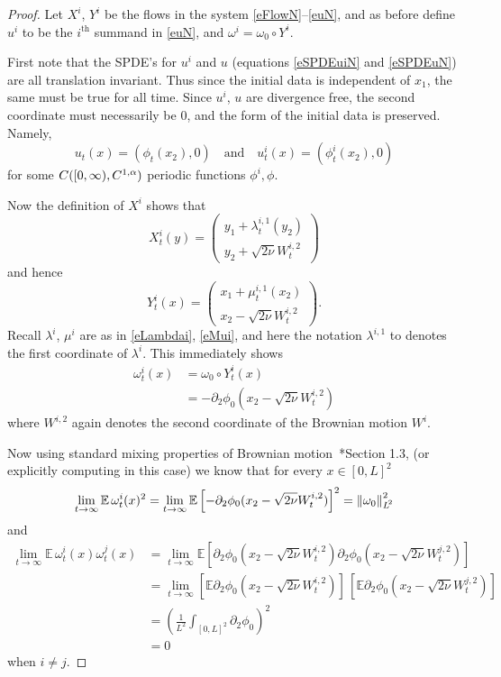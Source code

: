 \documentclass[final]{amsart}%
\newcommand{\mceuler}{\eqref{eFlowN}--\eqref{euN}\xspace}
\newcommand{\del}{\partial}
\newcommand{\E}{\mathbb{E}}
\newcommand{\holderspace}[2]{\ensuremath{C^{\ifx0#1{#2}\else{#1,#2}\fi}}}
\newif\iftextstyle
\newcommand{\norm}[1]{\iftextstyle\lVert#1\rVert\else\left\lVert#1\right\rVert\fi}
\newcommand{\lpnorm}[2]{\norm{#1}_{\smash{L^{\!#2}_{\vphantom{h}}}\vphantom{L^{\!#2}}}}
\numberwithin{equation}{section}
\theoremstyle{definition}
\theoremstyle{remark}
\begin{document}
\begin{proof}%
Let $X^i$, $Y^i$ be the flows in the system \mceuler, and as before define $u^i$ to be the $i^\text{th}$ summand in \eqref{euN}, and $\omega^i = \omega_0 \circ Y^i$.

First note that the SPDE's for $u^i$ and $u$ (equations \eqref{eSPDEuiN} and \eqref{eSPDEuN}) are all translation invariant. Thus since the initial data is independent of $x_1$, the same must be true for all time. Since $u^i$, $u$ are divergence free, the second coordinate must necessarily be $0$, and the form of the initial data is preserved. Namely,
$$
u_t(x) = (\phi_t(x_2), 0) \quad\text{and}\quad u^i_t(x) = (\phi^i_t(x_2), 0) 
$$
for some $C([0,\infty), \holderspace{1}{\alpha})$ periodic functions $\phi^i, \phi$.

Now the definition of $X^i$ shows that
$$
X^i_t(y) =
\begin{pmatrix}
  y_1 + \lambda^{i,1}_t(y_2)\\
  y_2 + \sqrt{2\nu} W^{i,2}_t
\end{pmatrix}
$$
and hence
$$
Y^i_t(x) =
\begin{pmatrix}
  x_1 + \mu^{i,1}_t(x_2)\\
  x_2 - \sqrt{2\nu} W^{i,2}_t
\end{pmatrix}.
$$
Recall $\lambda^i$, $\mu^i$ are as in \eqref{eLambdai}, \eqref{eMui}, and here the notation $\lambda^{i,1}$ to denotes the first coordinate of $\lambda^i$. This immediately shows
\begin{align*}
\omega^i_t(x) &= \omega_0 \circ Y^i_t (x)\\
    &= -\del_2 \phi_0( x_2 - \sqrt{2\nu} W^{i,2}_t )
\end{align*}
where $W^{i,2}$ again denotes the second coordinate of the Brownian motion $W^i$.

Now using standard mixing properties of Brownian motion~\cite{kunita}*{Section 1.3}, (or explicitly computing in this case) we know that for every $x \in [0,L]^2$
\begin{equation}\label{eqnEOmegaSq}
  \lim_{t\to\infty} \E\, \omega^i_t(x)^2 = \lim_{t\to\infty} \E\left[-\del_2 \phi_0( x_2 - \sqrt{2\nu} W^{i,2}_t )\right]^2 = \lpnorm{\omega_0}{2}^2
\end{equation}
and
\begin{align}
\nonumber
\lim_{t\to\infty} \E\, \omega^i_t(x) \omega^j_t(x) &= \lim_{t\to\infty} \E \left[\del_2 \phi_0( x_2 - \sqrt{2\nu} W^{i,2}_t ) \del_2 \phi_0( x_2 - \sqrt{2\nu} W^{j,2}_t )\right]\\
\nonumber
    &= \lim_{t\to\infty} \left[\E \del_2 \phi_0( x_2 - \sqrt{2\nu} W^{i,2}_t )\right] \, \left[\E \del_2 \phi_0( x_2 - \sqrt{2\nu} W^{j,2}_t )\right]\\
\nonumber
    &= \left(\frac{1}{L^2} \int_{[0,L]^2} \del_2 \phi_0\right)^2\\
\label{eqnEOmegaiOmegaj}  &= 0
\end{align}
when $i \neq j$.


\end{proof}
\end{document}

